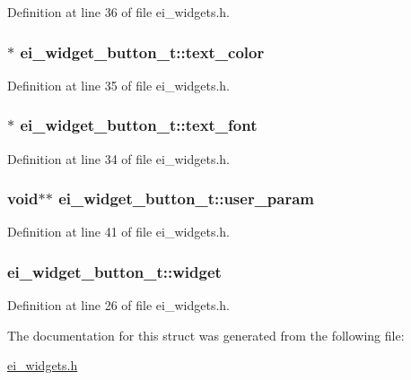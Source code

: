 Definition at line 36 of file ei\-\_\-widgets.\-h.

\hypertarget{structei__widget__button__t_ae53bef4e2ecd6f4337812125aa5b63a4}{
\subsubsection[{text\-\_\-color}]{$\ast$ ei\-\_\-widget\-\_\-button\-\_\-t\-::text\-\_\-color}}\label{structei__widget__button__t_ae53bef4e2ecd6f4337812125aa5b63a4}


Definition at line 35 of file ei\-\_\-widgets.\-h.

\hypertarget{structei__widget__button__t_a2617635a42c83b0b60bbf911f3d0c0f3}{
\subsubsection[{text\-\_\-font}]{$\ast$ ei\-\_\-widget\-\_\-button\-\_\-t\-::text\-\_\-font}}\label{structei__widget__button__t_a2617635a42c83b0b60bbf911f3d0c0f3}


Definition at line 34 of file ei\-\_\-widgets.\-h.

\hypertarget{structei__widget__button__t_a4108a67369f3f7ea55512d16b79aa6c3}{
\subsubsection[{user\-\_\-param}]{\setlength{\rightskip}{0pt plus 5cm}void$\ast$$\ast$ ei\-\_\-widget\-\_\-button\-\_\-t\-::user\-\_\-param}}\label{structei__widget__button__t_a4108a67369f3f7ea55512d16b79aa6c3}


Definition at line 41 of file ei\-\_\-widgets.\-h.

\hypertarget{structei__widget__button__t_acf769e84e4a3cd0201c019998850deef}{
\subsubsection[{widget}]{ ei\-\_\-widget\-\_\-button\-\_\-t\-::widget}}\label{structei__widget__button__t_acf769e84e4a3cd0201c019998850deef}


Definition at line 26 of file ei\-\_\-widgets.\-h.



The documentation for this struct was generated from the following file\-:\begin{DoxyCompactItemize}
\item 
\hyperlink{ei__widgets_8h}{ei\-\_\-widgets.\-h}\end{DoxyCompactItemize}
